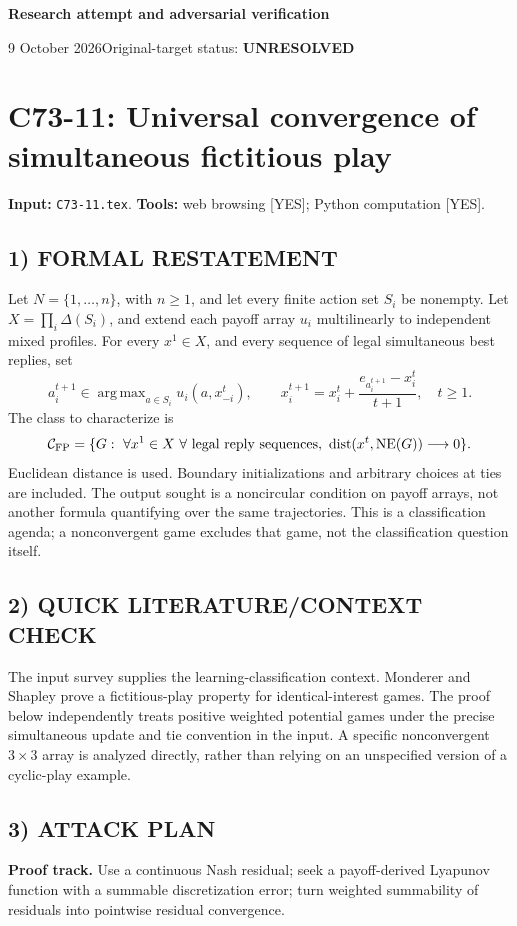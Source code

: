 \documentclass[11pt,a4paper]{article}
\newcommand{\NE}{\operatorname{NE}}
\DeclareMathOperator*{\argmax}{arg\,max}
\theoremstyle{definition}
\theoremstyle{remark}
\begin{document}
{\large\bfseries Research attempt and adversarial verification}\par
9 October 2026\hfill Original-target status: \textbf{UNRESOLVED}\par
\section{C73-11: Universal convergence of simultaneous fictitious play}
\label{sec:C73-11}
\noindent\textbf{Input:} \texttt{C73-11.tex}. \quad\textbf{Tools:} web browsing [YES]; Python computation [YES].

\subsection*{1) FORMAL RESTATEMENT}
Let $N=\{1,\ldots,n\}$, with $n\geq1$, and let every finite action set $S_i$ be
nonempty. Let $X=\prod_i\Delta(S_i)$, and extend each payoff array $u_i$
multilinearly to independent mixed profiles. For every $x^1\in X$, and every
sequence of legal simultaneous best replies, set
\[
 a_i^{t+1}\in\argmax_{a\in S_i}u_i(a,x_{-i}^t),\qquad
 x_i^{t+1}=x_i^t+\frac{e_{a_i^{t+1}}-x_i^t}{t+1},\quad t\geq1.
\]
The class to characterize is
\[
 \mathcal C_{\rm FP}=\{G:\ \forall x^1\in X\ \forall\text{ legal reply sequences},
 \ \operatorname{dist}(x^t,\NE(G))\longrightarrow0\}.
\]
Euclidean distance is used. Boundary initializations and arbitrary choices at ties
are included. The output sought is a noncircular condition on payoff arrays,
not another formula quantifying over the same trajectories. This is a classification
agenda; a nonconvergent game excludes that game, not the classification question itself.

\subsection*{2) QUICK LITERATURE/CONTEXT CHECK}
The input survey \cite{li-survey} supplies the learning-classification context.
Monderer and Shapley \cite{monderer-fp} prove a fictitious-play property for
identical-interest games. The proof below independently treats positive weighted
potential games under the precise simultaneous update and tie convention in the
input. A specific nonconvergent $3\times3$ array is analyzed directly, rather than
relying on an unspecified version of a cyclic-play example.

\subsection*{3) ATTACK PLAN}
\textbf{Proof track.} Use a continuous Nash residual; seek a payoff-derived
Lyapunov function with a summable discretization error; turn weighted summability
of residuals into pointwise residual convergence.
\end{document}

